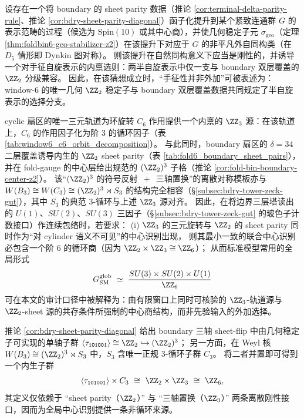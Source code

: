 \begin{conjecture}\label{conj:bdry-geo-z2-chiral-selection}
设存在一个将 boundary 的 sheet parity 数据（推论 \ref{cor:terminal-delta-parity-rule}、推论 \ref{cor:bdry-sheet-parity-diagonal}）函子化提升到某个紧致连通群 \(G\) 的表示范畴的过程（候选为 \(\mathrm{Spin}(10)\) 或其中心商），并使几何稳定子元 \(\sigma_{\mathrm{geo}}\)（定理 \ref{thm:foldbin6-geo-stabilizer-z2}）在该提升下对应于 \(G\) 的非平凡外自同构类（在 \(D_5\) 情形即 Dynkin 图对称）。
则该提升在自然同构意义下应当是刚性的，并诱导一个对手征自旋表示的内禀选则：两半自旋表示中仅一支与 boundary 双层覆盖的 \(\ZZ_2\) 分级兼容。
因此，在该猜想成立时，“手征性并非外加”可被表述为：window-\(6\) 的唯一几何 \(\ZZ_2\) 稳定子与 boundary 双层覆盖数据共同规定了半自旋表示的选择分支。
\end{conjecture}

\begin{corollary}[全局中心识别的最小一致性：\texorpdfstring{$\ZZ_2\times\ZZ_3\cong\ZZ_6$}{Z2xZ3=Z6}]\label{cor:bdry-global-z6-quotient}
cyclic 扇区的唯一三元轨道为环旋转 \(C_6\) 作用提供一个内禀的 \(\ZZ_3\) 源：在该轨道上，\(C_6\) 的作用因子化为阶 \(3\) 的循环因子（表 \ref{tab:window6_c6_orbit_decomposition}）。
与此同时，boundary 扇区的 \(\delta=34\) 二层覆盖诱导内生的 \(\ZZ_2\) sheet parity（表 \ref{tab:fold6_boundary_sheet_pairs}），并在 fold-gauge 的中心层给出规范的 \((\ZZ_2)^3\) 子格（推论 \ref{cor:fold-bin-boundary-center-z2}）。
该“\((\ZZ_2)^3\) 的符号反射 \(\,+\,\) 三轴置换”的离散对称模板亦与 \(W(B_3)\cong W(C_3)\cong (\ZZ_2)^3\rtimes S_3\) 的结构完全相容（\S\ref{subsec:bdry-tower-zeck-gut}），其中 \(S_3\) 的典范 \(3\)-循环与上述 \(\ZZ_3\) 源对齐。
因此，在将边界三层塔读出的 \(U(1)\)、\(SU(2)\)、\(SU(3)\) 三因子（\S\ref{subsec:bdry-tower-zeck-gut} 的玻色子计数接口）作连续包络时，若要求：
(i) \(\ZZ_3\) 的三元旋转与 \(\ZZ_2\) 的 sheet parity 同时作为“对 cylinder 语义不可见”的中心识别出现，
则其最小一致的联合中心识别必包含一个阶 \(6\) 的循环商（因为 \(\ZZ_2\times\ZZ_3\cong\ZZ_6\)）；
从而标准模型常用的全局形式
\[
G_{\mathrm{SM}}^{\mathrm{glob}}
\ \simeq\
\frac{SU(3)\times SU(2)\times U(1)}{\ZZ_6}
\]
可在本文的审计口径中被解释为：由有限窗口上同时可核验的 \(\ZZ_3\)-轨道源与 \(\ZZ_2\)-sheet 源的共存条件所强制的中心商结构，而非先验输入的外加选择。
\end{corollary}

\begin{remark}\label{rem:bdry-intrinsic-z6-diagz2-c3}
推论 \ref{cor:bdry-sheet-parity-diagonal} 给出 boundary 三轴 sheet-flip 中由几何稳定子可实现的单轴子群
\(
\langle\tau_{\texttt{101001}}\rangle\cong\ZZ_2\hookrightarrow (\ZZ_2)^3
\)；
另一方面，在 Weyl 核 \(W(B_3)\cong (\ZZ_2)^3\rtimes S_3\) 中，\(S_3\) 含唯一正规 \(3\)-循环子群 \(C_3\)。
将二者并置即可得到一个内生子群
\[
\langle\tau_{\texttt{101001}}\rangle\times C_3\ \cong\ \ZZ_2\times\ZZ_3\ \cong\ \ZZ_6,
\]
其定义仅依赖于 “sheet parity（\(\ZZ_2\)）” 与 “三轴置换（\(\ZZ_3\)）” 两条离散刚性接口，因而为全局中心识别提供一条非循环来源。
\end{remark}

